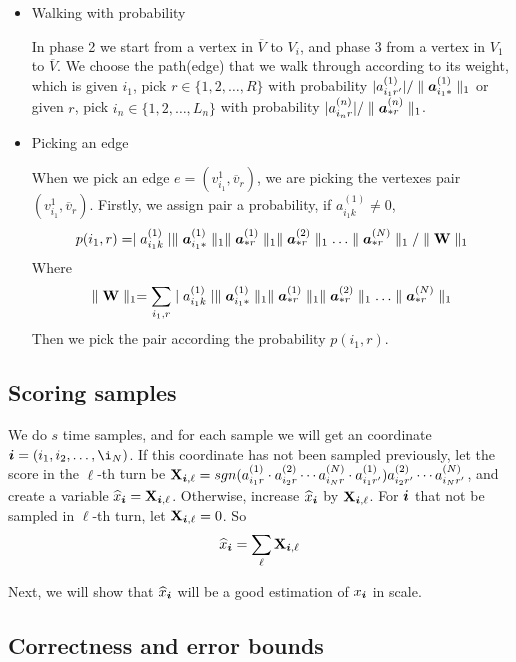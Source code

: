 \documentclass{article}
\newcommand{\Sca}[3]{{#1}^{(#2)}_{i_#2#3}}%
\newcommand{\V}[1]{{\bm{{\MakeLowercase{#1}}}}}%
\newcommand{\Varow}[1]{\V{a}^{(#1)}_{i_#1*}}
\newcommand{\Vacol}[1]{\V{a}^{(#1)}_{*r}}
\newcommand{\M}[1]{{\bm{\mathbf{\MakeUppercase{#1}}}}}%
\newcommand{\norm}[2]{\parallel#1\parallel_{#2}}
\begin{document}
\begin{itemize}
  \item Walking with probability

  In phase 2 we start from a vertex in $\overline{V}$ to $V_i$, and phase 3 from a vertex in $V_1$ to $\overline{V}$. We choose the path(edge) that we walk through according to its weight, which is given $i_1$, pick $r\in\{1,2,\ldots,R\}$ with probability $|\Sca{a}{1}{r'}|/\norm{\Varow{1}}{1}$ or given $r$, pick $i_n\in\{1,2,\ldots,L_n\}$ with probability $|\Sca{a}{n}{r}|/\norm{\Vacol{n}}{1}$.

  \item Picking an edge

  When we pick an edge $e=(v^1_{i_1},\overline{v}_r)$, we are picking the vertexes pair $(v^1_{i_1},\overline{v}_r)$. Firstly, we assign pair a probability, if $ \Sca{a}{1}{k} \neq 0 $,
  \[
    p(i_1,r) = \mid\Sca{a}{1}{k}\mid \norm{\Varow{1}}{1} \norm{\Vacol{1}}{1} \norm{\Vacol{2}}{1} \ldots \norm{\Vacol{N}}{1} / \norm{\M{W}}{1}
  \]
  Where
  \[
    \norm{\M{W}}{1} = \sum_{i_1,r}\mid \Sca{a}{1}{k}\mid \norm{\Varow{1}}{1} \norm{\Vacol{1}}{1} \norm{\Vacol{2}}{1} \ldots \norm{\Vacol{N}}{1}
  \]
  Then we pick the pair according the probability $p(i_1,r)$.
\end{itemize}

\subsection{Scoring samples}

We do $s$ time samples, and for each sample we will get an coordinate $\V{i} = (i_1,i_2,\ldots,\i_N) $. If this coordinate has not been sampled previously, let the score in the $\ell $-th turn be
$ \M{X}_{\V{i},\ell}  = sgn(\Sca{a}{1}{r}\cdot\Sca{a}{2}{r}\cdots\Sca{a}{N}{r}\cdot\Sca{a}{1}{r'}) \Sca{a}{2}{r'}\cdots\Sca{a}{N}{r'}$,
and create a variable $\widehat{x}_{\V{i}} = \M{X}_{\V{i},\ell}$. Otherwise, increase $\widehat{x}_{\V{i}}$ by $\M{X}_{\V{i},\ell}$. For $\V{i}$ that not be sampled in $\ell$-th turn, let $\M{X}_{\V{i},\ell}=0$. So
\[
\widehat{x}_{\V{i}} = \sum_{\ell} \M{X}_{\V{i},\ell}
\]

Next, we will show that $\widehat{x}_{\V{i}}$ will be a good estimation of $x_{\V{i}}$ in scale.

\subsection{Correctness and error bounds}
\end{document}

